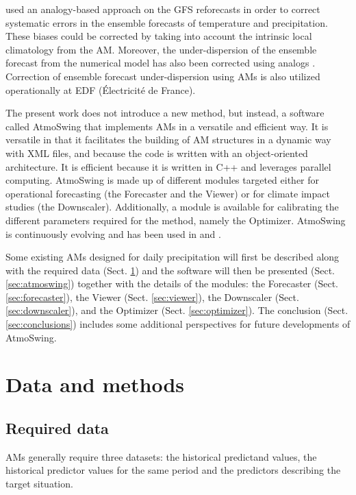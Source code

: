 \documentclass[review]{elsarticle}
\begin{document}
\citet{Hamill2006} used an analogy-based approach on the GFS reforecasts in order to correct systematic errors in the ensemble forecasts of temperature and precipitation. These biases could be corrected by taking into account the intrinsic local climatology from the AM. Moreover, the under-dispersion of the ensemble forecast from the numerical model has also been corrected using analogs \citep{Hamill2006}. Correction of ensemble forecast under-dispersion using AMs is also utilized operationally at EDF (\'{E}lectricit\'{e} de France).

The present work does not introduce a new method, but instead, a software called AtmoSwing that implements AMs in a versatile and efficient way. It is versatile in that it facilitates the building of AM structures in a dynamic way with XML files, and because the code is written with an object-oriented architecture. It is efficient because it is written in C++ and leverages parallel computing. AtmoSwing is made up of different modules targeted either for operational forecasting (the Forecaster and the Viewer) or for climate impact studies (the Downscaler). Additionally, a module is available for calibrating the different parameters required for the method, namely the Optimizer. AtmoSwing is continuously evolving and has been used in \citet{Horton2012, Horton2017a, Horton2017b, Horton2018a} and \citet{Horton2018b}.

Some existing AMs designed for daily precipitation will first be described along with the required data (Sect. \ref{sec:data_methods}) and the software will then be presented (Sect. \ref{sec:atmoswing}) together with the details of the modules: the Forecaster (Sect. \ref{sec:forecaster}), the Viewer (Sect. \ref{sec:viewer}), the Downscaler (Sect. \ref{sec:downscaler}), and the Optimizer (Sect. \ref{sec:optimizer}). The conclusion (Sect. \ref{sec:conclusions}) includes some additional perspectives for future developments of AtmoSwing. 


\section{Data and methods}
\label{sec:data_methods}


\subsection{Required data}
\label{sec:data}

AMs generally require three datasets: the historical predictand values, the historical predictor values for the same period and the predictors describing the target situation.
\end{document}
